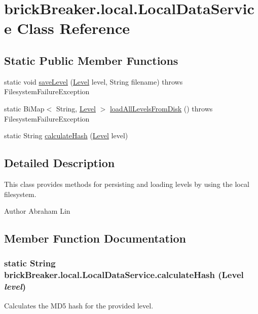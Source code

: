 \hypertarget{classbrick_breaker_1_1local_1_1_local_data_service}{
\section{brickBreaker.local.LocalDataService Class Reference}
\label{classbrick_breaker_1_1local_1_1_local_data_service}
}
\subsection*{Static Public Member Functions}
\begin{DoxyCompactItemize}
\item 
static void \hyperlink{classbrick_breaker_1_1local_1_1_local_data_service_a01f5a08e38cd865add34f24a7634cf38}{saveLevel} (\hyperlink{classbrick_breaker_1_1_level}{Level} level, String filename)  throws FilesystemFailureException 
\item 
static BiMap$<$ String, \hyperlink{classbrick_breaker_1_1_level}{Level} $>$ \hyperlink{classbrick_breaker_1_1local_1_1_local_data_service_a498aa81a0d3ac82f0818dd9e3df6ee3d}{loadAllLevelsFromDisk} ()  throws FilesystemFailureException 
\item 
static String \hyperlink{classbrick_breaker_1_1local_1_1_local_data_service_a81493703f640a10d1b66fe2110f01d48}{calculateHash} (\hyperlink{classbrick_breaker_1_1_level}{Level} level)
\end{DoxyCompactItemize}


\subsection{Detailed Description}
This class provides methods for persisting and loading levels by using the local filesystem.

\begin{DoxyAuthor}{Author}
Abraham Lin 
\end{DoxyAuthor}


\subsection{Member Function Documentation}
\hypertarget{classbrick_breaker_1_1local_1_1_local_data_service_a81493703f640a10d1b66fe2110f01d48}{
\subsubsection[{calculateHash}]{\setlength{\rightskip}{0pt plus 5cm}static String brickBreaker.local.LocalDataService.calculateHash ({\bf Level} {\em level})}}
\label{classbrick_breaker_1_1local_1_1_local_data_service_a81493703f640a10d1b66fe2110f01d48}
Calculates the MD5 hash for the provided level.



